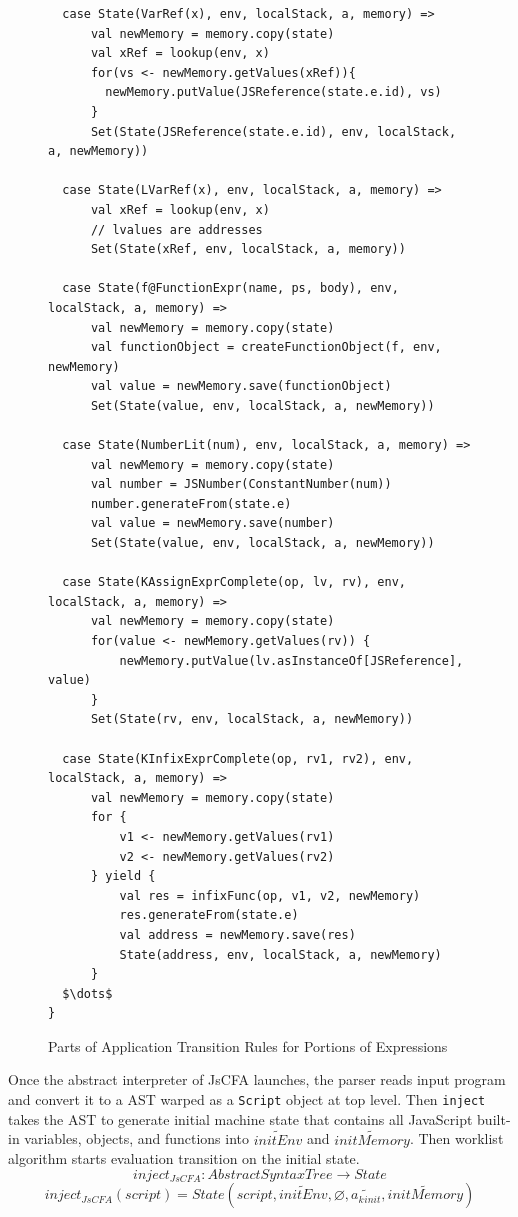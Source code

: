 \documentclass{article}
\begin{document}
\begin{figure}
\lstset{language=Scala, mathescape}
\begin{lstlisting}
  case State(VarRef(x), env, localStack, a, memory) =>
      val newMemory = memory.copy(state)
      val xRef = lookup(env, x)
      for(vs <- newMemory.getValues(xRef)){
        newMemory.putValue(JSReference(state.e.id), vs)
      }
      Set(State(JSReference(state.e.id), env, localStack, a, newMemory))

  case State(LVarRef(x), env, localStack, a, memory) =>
      val xRef = lookup(env, x)
      // lvalues are addresses
      Set(State(xRef, env, localStack, a, memory))

  case State(f@FunctionExpr(name, ps, body), env, localStack, a, memory) =>
      val newMemory = memory.copy(state)
      val functionObject = createFunctionObject(f, env, newMemory)
      val value = newMemory.save(functionObject)
      Set(State(value, env, localStack, a, newMemory))

  case State(NumberLit(num), env, localStack, a, memory) =>
      val newMemory = memory.copy(state)
      val number = JSNumber(ConstantNumber(num))
      number.generateFrom(state.e)
      val value = newMemory.save(number)
      Set(State(value, env, localStack, a, newMemory))

  case State(KAssignExprComplete(op, lv, rv), env, localStack, a, memory) =>
      val newMemory = memory.copy(state)
      for(value <- newMemory.getValues(rv)) {
          newMemory.putValue(lv.asInstanceOf[JSReference], value)
      }
      Set(State(rv, env, localStack, a, newMemory))

  case State(KInfixExprComplete(op, rv1, rv2), env, localStack, a, memory) =>
      val newMemory = memory.copy(state)
      for {
          v1 <- newMemory.getValues(rv1)
          v2 <- newMemory.getValues(rv2)
      } yield {
          val res = infixFunc(op, v1, v2, newMemory)
          res.generateFrom(state.e)
          val address = newMemory.save(res)
          State(address, env, localStack, a, newMemory)
      }
  $\dots$
}
\end{lstlisting}
\caption{Parts of Application Transition Rules for Portions of Expressions}
\label{fig:app-expr}
\end{figure}

Once the abstract interpreter of JsCFA launches, the parser reads input program and convert it to a AST warped as a \verb|Script| object at top level.
Then \verb|inject| takes the AST to generate initial machine state that contains all JavaScript built-in variables, objects, and functions into $\widetilde{initEnv}$ and $\widetilde{initMemory}$. Then worklist algorithm starts evaluation transition on the initial state.
\[
inject_{JsCFA} : AbstractSyntaxTree \to State
\]
\[
inject_{JsCFA}(script) = State(script, \widetilde{initEnv}, \varnothing, \widetilde{a_k{}_{init}}, \widetilde{initMemory})
\]
\end{document}
